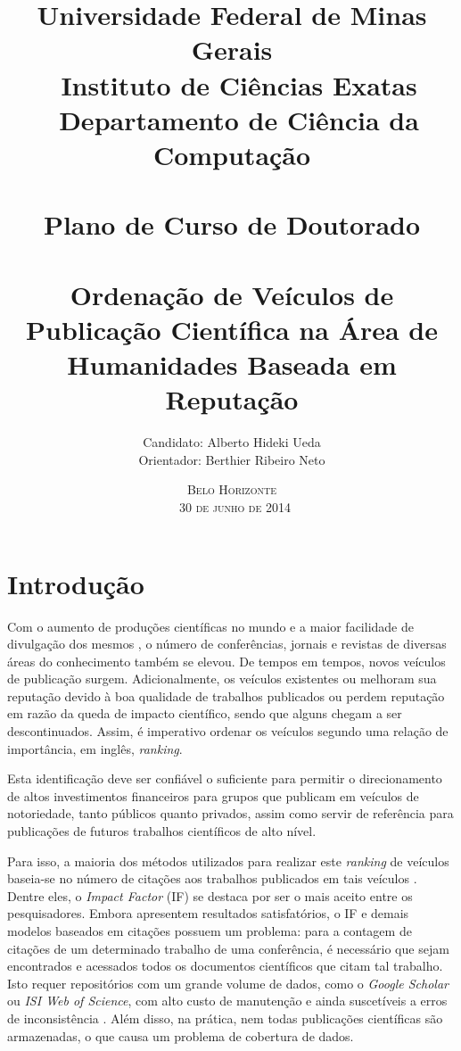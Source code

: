 \documentclass[a4paper,12pt,titlepage]{article}
\title{\large
Universidade Federal de Minas Gerais \\ \
Instituto de Ciências Exatas \\ \ 
Departamento de Ciência da Computação \\ \
\\[1cm]
Plano de Curso de Doutorado\\ \
\\[1cm]
\textbf{\Large Ordenação de Veículos de Publicação Científica na Área de Humanidades Baseada em Reputação }
\\[1cm]
}
\author{\large Candidato: Alberto Hideki Ueda \\[0.5cm] 
	Orientador: Berthier Ribeiro Neto 
\\[3cm] }
\date{\textsc{Belo Horizonte\\ \
30 de junho de 2014}}
\begin{document}
\maketitle

\renewcommand*\contentsname{Sumário}
\tableofcontents 
\pagebreak

\section{Introdução} 
Com o aumento de produções científicas no mundo e a maior facilidade de divulgação dos mesmos \cite{theguardian}, o número de conferências, jornais e revistas de diversas áreas do conhecimento também se elevou. De tempos em tempos, novos veículos de publicação surgem. Adicionalmente, os veículos existentes ou melhoram sua reputação devido à boa qualidade de trabalhos publicados ou perdem reputação em razão da queda de impacto científico, sendo que alguns chegam a ser descontinuados. Assim, é imperativo ordenar os veículos segundo uma relação de importância, em inglês, \textit{ranking}. %

Esta identificação deve ser confiável o suficiente para permitir o direcionamento de altos investimentos financeiros para grupos que publicam em veículos de notoriedade, tanto públicos quanto privados, assim como servir de referência para publicações de futuros trabalhos científicos de alto nível. 

Para isso, a maioria dos métodos utilizados para realizar este \textit{ranking} de veículos baseia-se no número de citações aos trabalhos publicados em tais veículos \cite{rahm, mann}. Dentre eles, o \textit{Impact Factor} (IF) \cite{if} se destaca por ser o mais aceito entre os pesquisadores. Embora apresentem resultados satisfatórios, o IF e demais modelos baseados em citações possuem um problema: para a contagem de citações de um determinado trabalho de uma conferência, é necessário que sejam encontrados e acessados todos os documentos científicos que citam tal trabalho. Isto requer repositórios com um grande volume de dados, como o \textit{Google Scholar} ou \textit{ISI Web of Science}, com alto custo de manutenção e ainda suscetíveis a erros de inconsistência \cite{erros1, erros2, erros3, erros4}. Além disso, na prática, nem todas publicações científicas são armazenadas, o que causa um problema de cobertura de dados.
\end{document}

